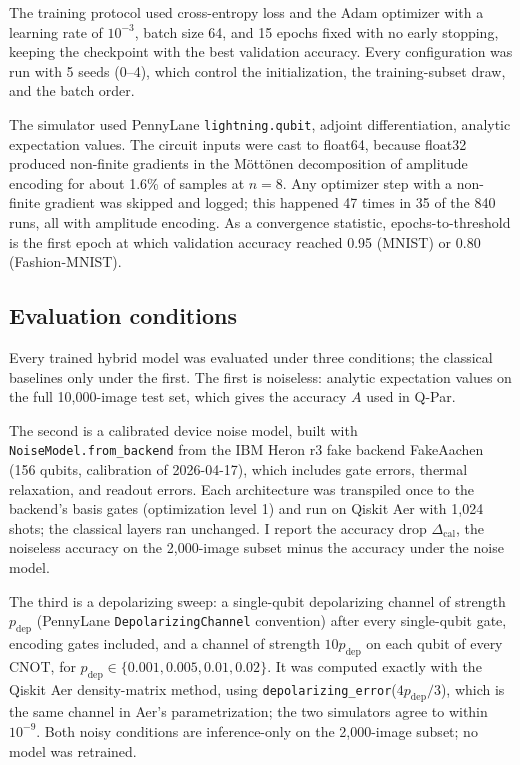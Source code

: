 \documentclass{ieeeaccess}
\newcommand{\pdep}{p_{\mathrm{dep}}}           %
\newcommand{\Dcal}{\Delta_{\mathrm{cal}}}
\begin{document}
The training protocol used cross-entropy loss and the Adam optimizer \cite{kingma2015adam} with a learning rate of $10^{-3}$, batch size 64, and 15 epochs fixed with no early stopping, keeping the checkpoint with the best validation accuracy. Every configuration was run with 5 seeds (0--4), which control the initialization, the training-subset draw, and the batch order.

The simulator used PennyLane \cite{bergholm2018pennylane} \texttt{lightning.\allowbreak qubit}, adjoint differentiation, analytic expectation values. The circuit inputs were cast to float64, because float32 produced non-finite gradients in the M\"ott\"onen decomposition of amplitude encoding for about 1.6\% of samples at $n = 8$. Any optimizer step with a non-finite gradient was skipped and logged; this happened 47 times in 35 of the 840 runs, all with amplitude encoding. As a convergence statistic, epochs-to-threshold is the first epoch at which validation accuracy reached 0.95 (MNIST) or 0.80 (Fashion-MNIST).

\subsection{Evaluation conditions}
\label{sec:design-eval}

Every trained hybrid model was evaluated under three conditions; the classical baselines only under the first. The first is noiseless: analytic expectation values on the full 10,000-image test set, which gives the accuracy $A$ used in Q-Par.

The second is a calibrated device noise model, built with \texttt{NoiseModel.from\_backend} from the IBM Heron r3 fake backend FakeAachen (156 qubits, calibration of 2026-04-17), which includes gate errors, thermal relaxation, and readout errors. Each architecture was transpiled once to the backend's basis gates (optimization level 1) and run on Qiskit Aer \cite{javadiabhari2024qiskit} with 1,024 shots; the classical layers ran unchanged. I report the accuracy drop $\Dcal$, the noiseless accuracy on the 2,000-image subset minus the accuracy under the noise model.

The third is a depolarizing sweep: a single-qubit depolarizing channel of strength $\pdep$ (PennyLane \texttt{Depolarizing\allowbreak Channel} convention) after every single-qubit gate, encoding gates included, and a channel of strength $10\pdep$ on each qubit of every CNOT, for $\pdep \in \{0.001, 0.005, 0.01, 0.02\}$. It was computed exactly with the Qiskit Aer density-matrix method, using \texttt{depolarizing\_error}($4\pdep/3$), which is the same channel in Aer's parametrization; the two simulators agree to within $10^{-9}$. Both noisy conditions are inference-only on the 2,000-image subset; no model was retrained.
\end{document}
